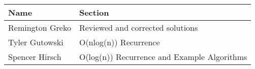 \documentclass{article}
\begin{document}
\bigskip

\pagebreak

\begin{center}
        \begin{tabular}{|p{3cm}|p{6cm}|}
            \hline
            \textbf{Name} & \textbf{Section} \\
            \hline
            Remington Greko & Reviewed and corrected solutions\\
            \hline
            Tyler Gutowski & O(nlog(n)) Recurrence\\
            \hline
            Spencer Hirsch & O(log(n)) Recurrence and Example Algorithms\\
            \hline
        \end{tabular}
    \end{center}
\end{document}
